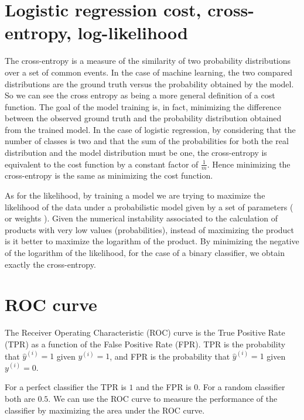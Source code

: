 \documentclass[a4paper]{article}
\begin{document}

\section{Logistic regression cost, cross-entropy, log-likelihood}
The cross-entropy is a measure of the similarity of two probability distributions over a set of common events. In the case of machine learning, the two compared distributions are the ground truth versus the probability obtained by the model. So we can see the cross entropy as being a more general definition of a cost function. The goal of the model training is, in fact, minimizing the difference between the observed ground truth and the probability distribution obtained from the trained model. In the case of logistic regression, by considering that the number of classes is two and that the sum of the probabilities for both the real distribution and the model distribution must be one, the cross-entropy is equivalent to the cost function by a constant factor of $\frac{1}{m}$. Hence minimizing the cross-entropy is the same as minimizing the cost function.

As for the likelihood, by training a model we are trying to maximize the likelihood of the data under a probabilistic model given by a set of parameters ( or weights ). Given the numerical instability associated to the calculation of products with very low values (probabilities), instead of maximizing the product is it better to maximize the logarithm of the product. By minimizing the negative of the logarithm of the likelihood, for the case of a binary classifier, we obtain exactly the cross-entropy.

\section{ROC curve}
The Receiver Operating Characteristic (ROC) curve is the True Positive Rate (TPR) as a function of the False Positive Rate (FPR). TPR is the probability that $\hat{y}^{(i)}=1$ given $y^{(i)}=1$, and FPR is the probability that $\hat{y}^{(i)}=1$ given $y^{(i)}=0$.

For a perfect classifier the TPR is $1$ and the FPR is $0$. For a random classifier both are $0.5$. We can use the ROC curve to measure the performance of the classifier by maximizing the area under the ROC curve.
\end{document}
